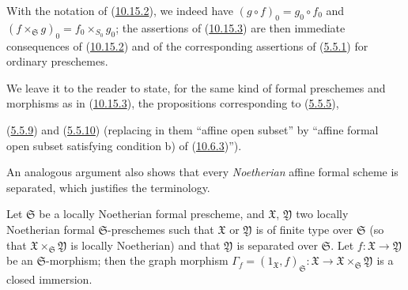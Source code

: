 With the notation of (\hyperref[I.10.15.2]{10.15.2}), we indeed have
$(g\circ f)_0=g_0\circ f_0$ and
$(f\times_{\mathfrak{S}}g)_0=f_0\times_{S_0}g_0$; the assertions of
(\hyperref[I.10.15.3]{10.15.3}) are then immediate consequences of
(\hyperref[I.10.15.2]{10.15.2}) and of the corresponding assertions of
(\hyperref[I.5.5.1]{5.5.1}) for ordinary preschemes.

We leave it to the reader to state, for the same kind of
formal preschemes and morphisms as in
(\hyperref[I.10.15.3]{10.15.3}), the propositions corresponding to
(\hyperref[I.5.5.5]{5.5.5}),

(\hyperref[I.5.5.9]{5.5.9}) and
(\hyperref[I.5.5.10]{5.5.10}) (replacing in them ``affine open subset'' by
``affine formal open subset satisfying condition b) of
(\hyperref[I.10.6.3]{10.6.3})'').

An analogous argument also shows that every \emph{Noetherian} affine formal
scheme is separated, which justifies the terminology.

\begin{proposition}[10.15.4]
\label{I.10.15.4}
Let $\mathfrak{S}$ be a locally Noetherian formal prescheme, and
$\mathfrak{X}$, $\mathfrak{Y}$ two locally Noetherian formal
$\mathfrak{S}$-preschemes such that $\mathfrak{X}$ or $\mathfrak{Y}$ is of
finite type over $\mathfrak{S}$ (so that
$\mathfrak{X}\times_{\mathfrak{S}}\mathfrak{Y}$ is locally Noetherian)
and that $\mathfrak{Y}$ is separated over $\mathfrak{S}$. Let
$f:\mathfrak{X}\to\mathfrak{Y}$ be an $\mathfrak{S}$-morphism; then the
graph morphism
$\Gamma_f=(1_{\mathfrak{X}},f)_{\mathfrak{S}}:\mathfrak{X}\to
\mathfrak{X}\times_{\mathfrak{S}}\mathfrak{Y}$ is a closed immersion.
\end{proposition}

